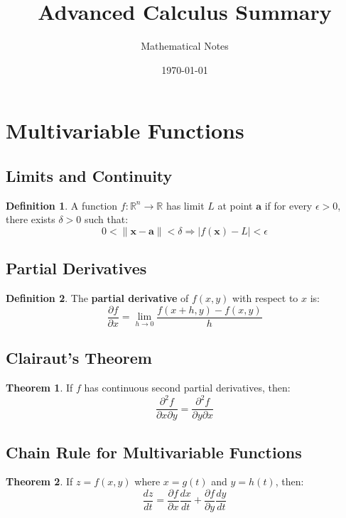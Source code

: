 \documentclass[11pt]{article}
\title{Advanced Calculus Summary}
\author{Mathematical Notes}
\date{\today}
\theoremstyle{definition}
\newtheorem{definition}{Definition}[section]
\newtheorem{theorem}{Theorem}[section]
\begin{document}
\maketitle

\tableofcontents
\newpage

\section{Multivariable Functions}

\subsection{Limits and Continuity}
\begin{definition}
A function $f: \mathbb{R}^n \to \mathbb{R}$ has limit $L$ at point $\mathbf{a}$ if for every $\epsilon > 0$, there exists $\delta > 0$ such that:
$$0 < \|\mathbf{x} - \mathbf{a}\| < \delta \Rightarrow |f(\mathbf{x}) - L| < \epsilon$$
\end{definition}

\subsection{Partial Derivatives}
\begin{definition}
The \textbf{partial derivative} of $f(x,y)$ with respect to $x$ is:
$$\frac{\partial f}{\partial x} = \lim_{h \to 0} \frac{f(x+h,y) - f(x,y)}{h}$$
\end{definition}

\subsection{Clairaut's Theorem}
\begin{theorem}
If $f$ has continuous second partial derivatives, then:
$$\frac{\partial^2 f}{\partial x \partial y} = \frac{\partial^2 f}{\partial y \partial x}$$
\end{theorem}

\subsection{Chain Rule for Multivariable Functions}
\begin{theorem}
If $z = f(x,y)$ where $x = g(t)$ and $y = h(t)$, then:
$$\frac{dz}{dt} = \frac{\partial f}{\partial x} \frac{dx}{dt} + \frac{\partial f}{\partial y} \frac{dy}{dt}$$
\end{theorem}
\end{document}
